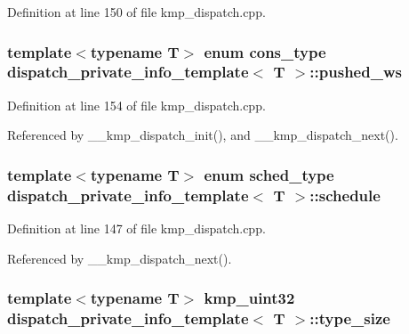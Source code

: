 Definition at line 150 of file kmp\-\_\-dispatch.\-cpp.

\hypertarget{structdispatch__private__info__template_aae7f21fbe2cebe26a14031af3bf17285}{
\subsubsection[{pushed\-\_\-ws}]{\setlength{\rightskip}{0pt plus 5cm}template$<$typename T$>$ enum {\bf cons\-\_\-type} {\bf dispatch\-\_\-private\-\_\-info\-\_\-template}$<$ T $>$\-::pushed\-\_\-ws}}\label{structdispatch__private__info__template_aae7f21fbe2cebe26a14031af3bf17285}


Definition at line 154 of file kmp\-\_\-dispatch.\-cpp.



Referenced by \-\_\-\-\_\-kmp\-\_\-dispatch\-\_\-init(), and \-\_\-\-\_\-kmp\-\_\-dispatch\-\_\-next().

\hypertarget{structdispatch__private__info__template_afc7085a386a2b7b867aad26bbe8dfea7}{
\subsubsection[{schedule}]{\setlength{\rightskip}{0pt plus 5cm}template$<$typename T$>$ enum {\bf sched\-\_\-type} {\bf dispatch\-\_\-private\-\_\-info\-\_\-template}$<$ T $>$\-::schedule}}\label{structdispatch__private__info__template_afc7085a386a2b7b867aad26bbe8dfea7}


Definition at line 147 of file kmp\-\_\-dispatch.\-cpp.



Referenced by \-\_\-\-\_\-kmp\-\_\-dispatch\-\_\-next().

\hypertarget{structdispatch__private__info__template_a34d33703aed7b118cffb529ec6ec49e3}{
\subsubsection[{type\-\_\-size}]{\setlength{\rightskip}{0pt plus 5cm}template$<$typename T$>$ kmp\-\_\-uint32 {\bf dispatch\-\_\-private\-\_\-info\-\_\-template}$<$ T $>$\-::type\-\_\-size}}\label{structdispatch__private__info__template_a34d33703aed7b118cffb529ec6ec49e3}


